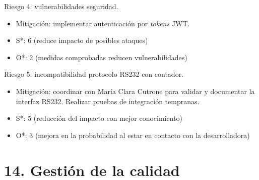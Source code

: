 \documentclass[
11pt, %
]{charter}
\begin{document}
Riesgo 4: vulnerabilidades seguridad.
\begin{itemize}
\item Mitigación: implementar autenticación por \textit{tokens} JWT.
\item S*: 6 (reduce impacto de posibles ataques)
\item O*: 2 (medidas comprobadas reducen vulnerabilidades)
\end{itemize}

Riesgo 5: incompatibilidad protocolo RS232 con contador.
\begin{itemize}
\item Mitigación: coordinar con María Clara Cutrone para validar y documentar la interfaz RS232. Realizar pruebas de integración tempranas.
\item S*: 5 (reducción del impacto con mejor conocimiento)
\item O*: 3 (mejora en la probabilidad al estar en contacto con la desarrolladora)
\end{itemize}



\section{14. Gestión de la calidad}
\label{sec:calidad}
\end{document}
